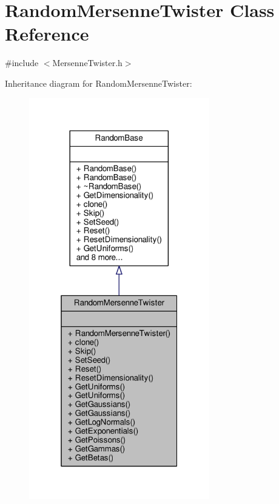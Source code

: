 \hypertarget{classRandomMersenneTwister}{}\section{Random\+Mersenne\+Twister Class Reference}
\label{classRandomMersenneTwister}


{\ttfamily \#include $<$Mersenne\+Twister.\+h$>$}



Inheritance diagram for Random\+Mersenne\+Twister\+:
\nopagebreak
\begin{figure}[H]
\begin{center}
\leavevmode
\includegraphics[width=223pt]{classRandomMersenneTwister__inherit__graph}
\end{center}
\end{figure}


